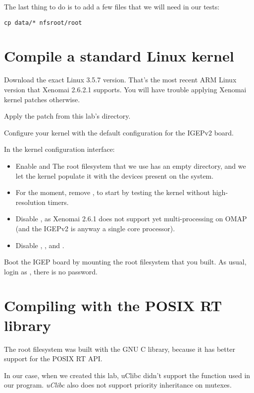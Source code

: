 The last thing to do is to add a few files that we will need in our
tests:

\begin{verbatim}
cp data/* nfsroot/root
\end{verbatim}

\section{Compile a standard Linux kernel}

Download the exact Linux 3.5.7 version. That's the most recent
ARM Linux version that Xenomai 2.6.2.1 supports. You will have trouble
applying Xenomai kernel patches otherwise.

Apply the  patch from this
lab's  directory.

Configure your kernel with the default configuration for the IGEPv2
board.

In the kernel configuration interface:
\begin{itemize}
\item Enable  and 
      The root filesystem that we use has an empty 
      directory, and we let the kernel populate it with the devices
      present on the system.
\item For the moment, remove ,
      to start by testing the kernel without high-resolution timers.
\item Disable , as Xenomai 2.6.1 does not support
  yet multi-processing on OMAP (and the IGEPv2 is anyway a single
  core processor).
\item Disable ,
  ,  and
  .
\end{itemize}

Boot the IGEP board by mounting the root filesystem that you built.
As usual, login as , there is no password.

\section{Compiling with the POSIX RT library}

The root filesystem was built with the GNU C library, because it has
better support for the POSIX RT API.

In our case, when we created this lab, uClibc
didn't support the  function used in our
 program. {\em uClibc} also does not support priority
inheritance on mutexes.


